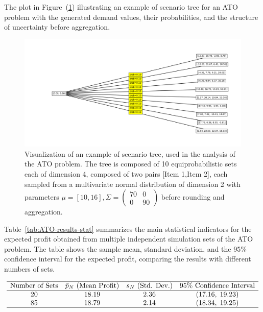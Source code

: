 \documentclass[a4paper,12pt]{article}
\begin{document}
	
	
	\newpage
	\noindent The plot in Figure~(\ref{fig:ato-scenariotree}) illustrating an example of scenario tree for an ATO problem  with the generated demand values, their probabilities, and the structure of uncertainty before aggregation.
	
	\begin{figure}[htbp]
		\centering
		\includegraphics[width=1\textwidth]{../immagini/scenariATO.png}
		\caption{Visualization of an example of scenario tree, used in the analysis of the ATO problem. The tree is composed of 10 equiprobabilistic sets each of dimension 4, composed of two pairs [Item 1,Item 2], each sampled from a multivariate normal distribution of dimension 2 with parameters $\mu = [10,16], \Sigma = \begin{pmatrix} 70 &0  \\ 0 &90  \end{pmatrix}$ before rounding and aggregation.}
		\label{fig:ato-scenariotree}
	\end{figure}
	
	\noindent
	Table~\ref{tab:ATO-results-stat} summarizes the main statistical indicators for the expected profit obtained from multiple independent simulation sets of the ATO problem. The table shows the sample mean, standard deviation, and the 95\% confidence interval for the expected profit, comparing the results with different numbers of sets.
	
	\[
	\begin{array}{cccc}
		\hline
		\text{Number of Sets} & \text{$\bar{p}_{N}$ (Mean Profit)} & \text{$s_{N}$ (Std. Dev.)} & \text{95\% Confidence Interval} \\
		\hline
		20 & 18.19 & 2.36 & (17.16,\; 19.23) \\
		85 & 18.79 & 2.14 & (18.34,\; 19.25) \\
		\hline
	\end{array}
	\]
	\label{tab:ATO-results-stat}
	
\end{document}
